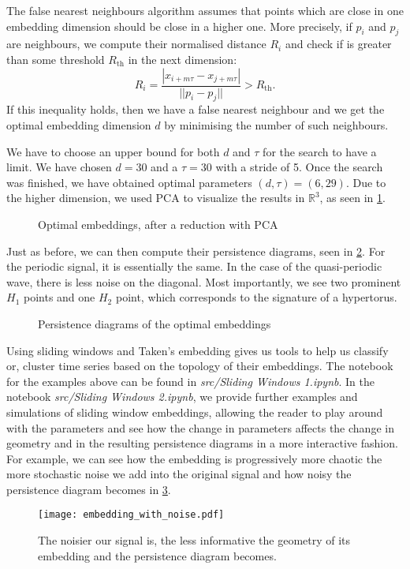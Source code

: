 The false nearest neighbours algorithm assumes that points which are close in one embedding dimension should be close in a higher one. More precisely, if $p_{i}$ and $p_{j}$ are neighbours, we compute their normalised distance $R_{i}$ and check if is greater than some threshold $R_{\text{th}}$ in the next dimension:
\begin{equation*}
  R_{i} = \frac{|x_{i+m\tau}-x_{j+m\tau}|}{||p_{i}-p_{j}||} > R_{\text{th}}.
\end{equation*}
If this inequality holds, then we have a false nearest neighbour and we get the optimal embedding dimension $d$ by minimising the number of such neighbours.

We have to choose an upper bound for both $d$ and $\tau$ for the search to have a limit. We have chosen $d=30$ and a $\tau=30$ with a stride of 5. Once the search was finished, we have obtained optimal parameters $(d, \tau) = (6, 29)$. Due to the higher dimension, we used PCA to visualize the results in $\mathbb{R}^{3}$, as seen in \ref{fig:embedding_automatic}.

\begin{figure}[h!]
    \centering
    \qquad
    \caption{Optimal embeddings, after a reduction with PCA}%
    \label{fig:embedding_automatic}%
\end{figure}

Just as before, we can then compute their persistence diagrams, seen in \ref{fig:embedding_automatic_diagrams}. For the periodic signal, it is essentially the same. In the case of the quasi-periodic wave, there is less noise on the diagonal. Most importantly, we see two prominent $H_{1}$ points and one $H_{2}$ point, which corresponds to the signature of a hypertorus.

\begin{figure}[h!]
    \centering
    \qquad
    \caption{Persistence diagrams of the optimal embeddings}%
    \label{fig:embedding_automatic_diagrams}%
\end{figure}

Using sliding windows and Taken's embedding gives us tools to help us classify or, cluster time series based on the topology of their embeddings. The notebook for the examples above can be found in \textit{src/Sliding Windows 1.ipynb}. In the notebook \textit{src/Sliding Windows 2.ipynb}, we provide further examples and simulations of sliding window embeddings, allowing the reader to play around with the parameters and see how the change in parameters affects the change in geometry and in the resulting persistence diagrams in a more interactive fashion. For example, we can see how the embedding is progressively more chaotic the more stochastic noise we add into the original signal and how noisy the persistence diagram becomes in \ref{fig:embedding_noise}.

\begin{figure}[h!]
  \centering
  \texttt{[image: embedding\_with\_noise.pdf]}
  \caption{The noisier our signal is, the less informative the geometry of its embedding and the persistence diagram becomes.}
  \label{fig:embedding_noise}
\end{figure}

